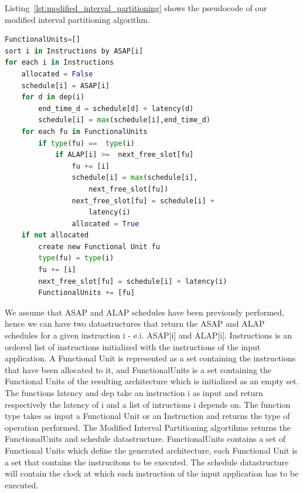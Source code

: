 Listing~\ref{lst:modified_interval_partitioning} shows the pseudocode of our modified interval partitioning algorithm. 
\begin{lstlisting}[language=Python, caption={Modified Interval Partitioning Algorithm}, label={lst:modified_interval_partitioning}]
FunctionalUnits=[]
sort i in Instructions by ASAP[i]
for each i in Instructions
	allocated = False
	schedule[i] = ASAP[i]
	for d in dep(i)
		end_time_d = schedule[d] + latency(d)
		schedule[i] = max(schedule[i],end_time_d)
	for each fu in FunctionalUnits 
		if type(fu) ==  type(i)
			if ALAP[i] >=  next_free_slot[fu]
				fu += [i]
				schedule[i] = max(schedule[i],
					next_free_slot[fu])
				next_free_slot[fu] = schedule[i] + 
					latency(i)
				allocated = True
	if not allocated
		create new Functional Unit fu
		type(fu) = type(i)
		fu += [i]
		next_free_slot[fu] = schedule[i] + latency(i)
		FunctionalUnits += [fu]

\end{lstlisting}
We assume that ASAP and ALAP schedules have been previously performed, hence we can have two datastructures that return the ASAP and ALAP schedules for a given instruction i - e.i. ASAP[i] and ALAP[i]. Instructions is an ordered list of instructions initialized with the instructions of the input application. A Functional Unit is represented as a set containing the instructions that have been allocated to it, and FunctionalUnits is a set containing the Functional Units of the resulting architecture which is initialized as an empty set. The functions latency and dep take an instruction i as input and return respectively the latency of i and a list of intructions i depends on. The function type
takes as input a Functional Unit or an Instruction and returns the type of operation performed.
The Modified Interval Partitioning algortihms returns the FunctionalUnits and schedule datastructure. FunctionalUnits contains a set of Functional Units which define the generated architecture, each Functional Unit is a set that contains the instrucitons to be executed. The schedule datastructure will contain the clock at which each instruction of the input application has to be executed.

